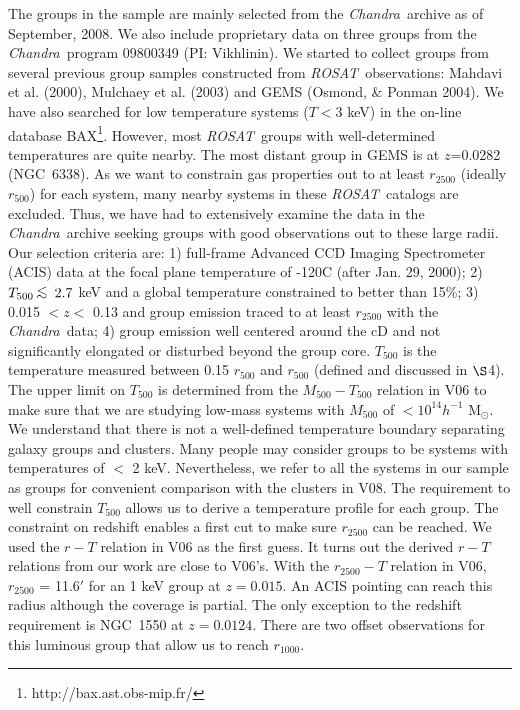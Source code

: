 \documentclass{aastex}
\newcommand{\lsim}{\mbox{\hspace{.2em}\raisebox{.5ex}{$<$}\hspace{-.8em}\raisebox{-.5ex}{$\sim$}
\hspace{.2em}}}
\def\chandra    {{\em Chandra}\/}
\def\rosat      {{\em ROSAT}\/}
\begin{document}
The groups in the sample are mainly selected from the \chandra\ archive as of September, 2008. 
We also include proprietary data on three groups from the \chandra\ program 09800349
(PI: Vikhlinin). We started to collect groups from several previous
group samples constructed from \rosat\ observations: Mahdavi et al. (2000),
Mulchaey et al. (2003) and GEMS (Osmond, \& Ponman 2004). We have also searched
for low temperature systems ($T < 3$ keV) in the on-line database 
BAX\footnote{http://bax.ast.obs-mip.fr/}. However, most \rosat\ groups with
well-determined temperatures are quite nearby. The most distant group in GEMS is at
$z$=0.0282 (NGC~6338). As we want to constrain gas properties out to at least $r_{2500}$
(ideally $r_{500}$) for each system, many nearby systems in these \rosat\
catalogs are excluded. Thus, we have had to extensively examine the data in the
\chandra\ archive seeking groups with good observations out to these large radii.
Our selection criteria are: 1) full-frame Advanced CCD Imaging Spectrometer (ACIS)
data at the focal plane temperature of -120C (after Jan. 29, 2000);
2) $T_{500} \lsim 2.7$ keV and a global temperature constrained to better
than 15\%; 3) 0.015 $<z<$ 0.13 and group emission traced to at least $r_{2500}$
with the \chandra\ data;
4) group emission well centered around the cD and not significantly
elongated or disturbed beyond the group core.
$T_{500}$ is the temperature measured between 0.15 $r_{500}$ and $r_{500}$
(defined and discussed in $\S$4). The upper limit on $T_{500}$ is determined
from the $M_{500} - T_{500}$ relation in V06 to make sure that we are studying low-mass
systems with $M_{500}$ of $< 10^{14} h^{-1}$ M$_{\odot}$. We understand that
there is not a well-defined temperature boundary separating galaxy groups and clusters.
Many people may consider groups to be systems with temperatures of $<$ 2 keV.
Nevertheless, we refer to all the systems in our sample as groups for
convenient comparison with the clusters in V08. The requirement to well constrain
$T_{500}$ allows us to derive a temperature profile for each group.
The constraint on redshift enables a first cut to make sure $r_{2500}$ can
be reached. We used the $r-T$ relation in V06 as the first guess. It turns out
the derived $r-T$ relations from our work are close to V06's. With the $r_{2500} - T$
relation in V06, $r_{2500}$ = 11.6$'$ for an 1 keV group at $z=0.015$. An ACIS
pointing can reach this radius although the coverage is partial.
The only exception to the redshift requirement is NGC~1550 at $z=0.0124$. There
are two offset observations for this luminous group that allow us to reach $r_{1000}$.
\end{document}

